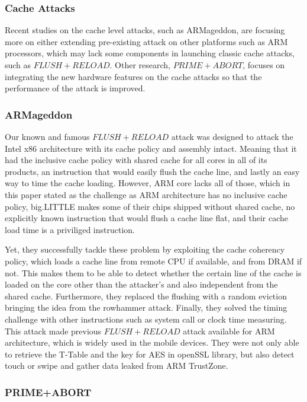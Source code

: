 \documentclass[a4paper]{article}
\begin{document}
\subsubsection{Cache Attacks}

Recent studies on the cache level attacks, such as ARMageddon, are focusing more on either extending pre-existing attack on other platforms such as ARM processors, which may lack some components in launching classic cache attacks, such as $FLUSH+RELOAD$. Other research, $PRIME+ABORT$, focuses on integrating the new hardware features on the cache attacks so that the performance of the attack is improved.

\subsubsection*{ARMageddon}

Our known and famous $FLUSH+RELOAD$ attack was designed to attack the Intel x86 architecture with its cache policy and assembly intact. Meaning that it had the inclusive cache policy with shared cache for all cores in all of its products, an instruction that would easily flush the cache line, and lastly an easy way to time the cache loading. However, ARM core lacks all of those, which in this paper stated as the challenge as ARM architecture has no inclusive cache policy, big.LITTLE makes some of their chips shipped without shared cache, no explicitly known instruction that would flush a cache line flat, and their cache load time is a priviliged instruction.
\par Yet, they successfully tackle these problem by exploiting the cache coherency policy, which loads a cache line from remote CPU if available, and from DRAM if not. This makes them to be able to detect whether the certain line of the cache is loaded on the core other than the attacker's and also independent from the shared cache. Furthermore, they replaced the flushing with a random eviction bringing the idea from the rowhammer attack. Finally, they solved the timing challenge with other instructions such as system call or clock time measuring. This attack made previous $FLUSH+RELOAD$ attack available for ARM architecture, which is widely used in the mobile devices. They were not only able to retrieve the T-Table and the key for AES in openSSL library, but also detect touch or swipe and gather data leaked from ARM TrustZone.

\subsubsection*{PRIME+ABORT}
\end{document}
